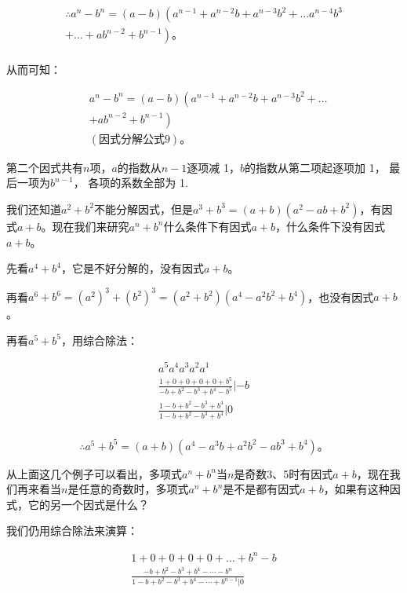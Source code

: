 \[
\begin{array}{l} \therefore a ^{n} - b ^{n} = (a - b) \left(a ^{n - 1} + a ^{n - 2} b + a ^{n - 3} b ^{2} + \dots a ^{n - 4} b ^{3} \right. \\ \left. + \dots + a b ^{n - 2} + b ^{n - 1}\right)\text{。} \\ \end{array}
\]

从而可知：

\[
\begin{array}{rl} & a ^{n} - b ^{n} = (a - b) \left(a ^{n - 1} + a ^{n - 2} b + a ^{n - 3} b ^{2} + \dots \right. \\ & \left. + a b ^{n - 2} + b ^{n - 1}\right) \\ & (\text{因式分解公式9})\text{。} \end{array}
\]

 第二个因式共有\(n\)项，\(a\)的指数从\(n - 1\)逐项减
1，\(b\)的指数从第二项起逐项加 1， 最后一项为\(b^{n - 1}\)，
各项的系数全部为 1.

我们还知道\(a^2 + b^2\)不能分解因式，但是\(a^3 + b^3 = (a + b)(a^2 - ab + b^2)\)，有因式\(a + b\)。现在我们来研究\(a^n + b^n\)什么条件下有因式\(a + b\)，什么条件下没有因式\(a + b\)。

先看\(a^4 + b^4\)，它是不好分解的，没有因式\(a + b\)。

再看\(a^6 + b^6 = (a^2)^3 + (b^2)^3 = (a^2 + b^2)(a^4 - a^2b^2 + b^4)\)，也没有因式\(a + b\)。

再看\(a^5 + b^5\)，用综合除法：

\[
\begin{array}{l} a ^{5} a ^{4} a ^{3} a ^{2} a ^{1} \\ \frac{1 + 0 + 0 + 0 + 0 + b ^{5}}{- b + b ^{2} - b ^{3} + b ^{4} - b ^{5}} \left| - b \right. \\ \frac{1 - b + b ^{2} - b ^{3} + b ^{4}}{1 - b + b ^{2} - b ^{3} + b ^{4}} \left| 0 \right. \\ \end{array}
\]

\[
\therefore a ^{5} + b ^{5} = (a + b) \left(a ^{4} - a ^{3} b + a ^{2} b ^{2} - a b ^{3} + b ^{4}\right)\text{。}
\]

从上面这几个例子可以看出，多项式\(a^n + b^n\)当\(n\)是奇数3、5时有因式\(a + b\)，现在我们再来看当\(n\)是任意的奇数时，多项式\(a^n + b^n\)是不是都有因式\(a + b\)，如果有这种因式，它的另一个因式是什么？

我们仍用综合除法来演算：

\[
\begin{array}{l} 1 + 0 + 0 + 0 + 0 + \dots + b ^{n} - b \\ \frac{- b + b ^{2} - b ^{3} + b ^{4} - \cdots - b ^{n}}{1 - b + b ^{2} - b ^{3} + b ^{4} - \cdots + b ^{n - 1} | 0} \\ \end{array}
\]

